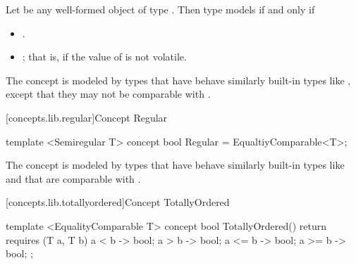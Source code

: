\begin{addedblock}

\begin{itemdescr}
\pnum
Let  be any well-formed object of type . Then type  models
 if and only if

\begin{itemize}
\item {}.
\item {}; that is, if the value of  is not volatile.
\end{itemize}

\pnum
\enternote The  concept is modeled by types that have behave similarly
built-in types like , except that they may not be comparable with \tcode{==}.\exitnote
\end{itemdescr}

[concepts.lib.regular]{Concept Regular}

%
\begin{itemdecl}
template <Semiregular T>
concept bool Regular =
  EqualtiyComparable<T>;
\end{itemdecl}

\begin{itemdescr}
\pnum
\enternote The  concept is modeled by types that have behave similarly
built-in types like  and that are comparable with \tcode{==}.\exitnote
\end{itemdescr}

[concepts.lib.totallyordered]{Concept TotallyOrdered}


%
\begin{itemdecl}
template <EqualityComparable T>
concept bool TotallyOrdered() {
  return requires (T a, T b) {
    { a < b } -> bool;
    { a > b } -> bool;
    { a <= b } -> bool;
    { a >= b } -> bool;
  };
}
\end{itemdecl}


\end{addedblock}
